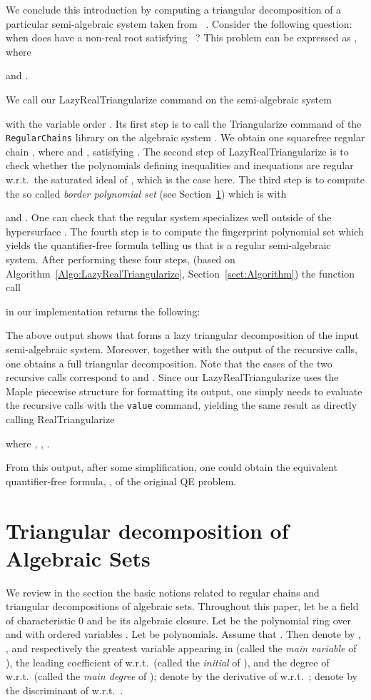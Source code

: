 \documentclass{sig-alternate}
\begin{document}
We conclude this introduction by 
 computing a 
triangular decomposition of a particular semi-algebraic system
taken from ~\cite{Brown05}.
Consider the following question: when does 
 have a non-real root 
satisfying ~?
This problem can be expressed as
, where

and
.


We call our {\sf LazyRealTriangularize} command
on the semi-algebraic system 

with the variable order .
Its first step is to call the {\sf Triangularize} 
command of the {\tt RegularChains}
library on the algebraic system .
We obtain one squarefree regular chain , 
where  and , satisfying .
The second step of {\sf LazyRealTriangularize}
is to check whether the polynomials
defining inequalities and inequations are regular w.r.t.\
the saturated ideal of , which is the case here.
The third step is to compute the so called
{\em border polynomial set} (see Section~\ref{sect:preliminary})
which is 
 with 

and
.
One can check that the regular system  
specializes well outside of the hypersurface .
The fourth step is to compute the fingerprint polynomial set
which yields the quantifier-free formula 
telling us that  is a regular semi-algebraic system.
After performing these four steps,
(based on 
Algorithm~\ref{Algo:LazyRealTriangularize}, 
Section~\ref{sect:Algorithm}) 
the function call
 
in our implementation returns the following:
{\small

}
The above output shows that  
forms a lazy triangular decomposition of the input semi-algebraic system.
Moreover, together with the output of the recursive calls,
one obtains  a full triangular decomposition.
Note that the cases of the two recursive calls
correspond to  and  .
Since our {\sf LazyRealTriangularize} uses the 
{\sc Maple} piecewise structure for formatting its output,
one simply needs to evaluate 
the recursive calls with the \verb+value+ command, yielding 
the same result as directly calling {\sf RealTriangularize}

{\small

}
where , ,
.

From this output, after some simplification, one could obtain the
equivalent quantifier-free formula, , of the original {\small QE} problem.


\section{Triangular decomposition  of \\ Algebraic Sets}
\label{sect:preliminary}
We review in the section the basic notions related
to regular chains and triangular decompositions
of algebraic sets.
Throughout this paper, let  be a field of 
characteristic 0 and
 be its algebraic closure.
Let  be the polynomial ring over 
 and with ordered variables . 
Let  be polynomials. 
Assume that .
Then denote by
, , and  
respectively
the greatest variable appearing in  
(called the {\em main variable} of ),
the leading coefficient of  w.r.t.\ 
(called the {\em initial} of ), and
the degree of  w.r.t.\ 
(called the {\em main degree} of );
denote by  the derivative of  w.r.t.\ ;
denote by  the discriminant of 
w.r.t.\ .
\end{document}
